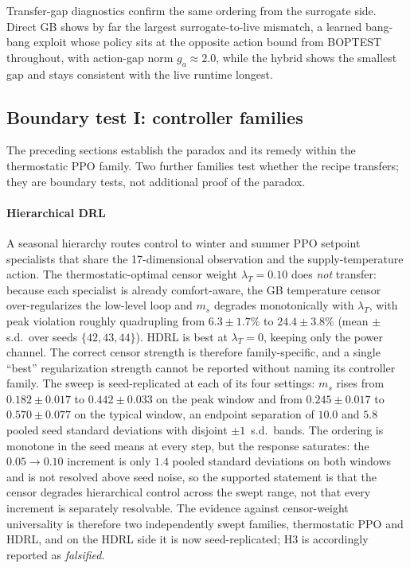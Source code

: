 \documentclass[5p]{elsarticle}
\newcommand{\ms}{\ensuremath{m_s}}
\begin{document}
Transfer-gap diagnostics confirm the same ordering from the surrogate side. Direct GB shows by far
the largest surrogate-to-live mismatch, a learned bang-bang exploit whose policy sits at the
opposite action bound from BOPTEST throughout, with action-gap norm $g_a\approx2.0$, while the
hybrid shows the smallest gap and stays consistent with the live runtime longest.

\subsection{Boundary test I: controller families}\label{sec:families}

The preceding sections establish the paradox and its remedy within the thermostatic PPO family. Two
further families test whether the recipe transfers; they are boundary tests, not additional proof of
the paradox.

\paragraph{Hierarchical DRL}
A seasonal hierarchy routes control to winter and summer PPO setpoint specialists that share the
17-dimensional observation and the supply-temperature action. The thermostatic-optimal censor weight
$\lambda_T=0.10$ does \emph{not} transfer: because each specialist is already comfort-aware, the GB
temperature censor over-regularizes the low-level loop and \ms{} degrades monotonically with
$\lambda_T$, with peak violation roughly quadrupling from $6.3\pm1.7\%$ to $24.4\pm3.8\%$
(mean $\pm$ s.d.\ over seeds $\{42,43,44\}$). HDRL is best at
$\lambda_T=0$, keeping only the power channel. The correct censor strength is therefore
family-specific, and a single ``best'' regularization strength cannot be reported without naming its
controller family. The sweep is seed-replicated at each of its four settings: \ms{} rises from
$0.182\pm0.017$ to $0.442\pm0.033$ on the peak window and from $0.245\pm0.017$ to
$0.570\pm0.077$ on the typical window, an endpoint separation of $10.0$ and $5.8$ pooled seed
standard deviations with disjoint $\pm1$~s.d.\ bands. The ordering is monotone in the seed means at
every step, but the response saturates: the $0.05\rightarrow0.10$ increment is only $1.4$ pooled
standard deviations on both windows and is not resolved above seed noise, so the supported statement
is that the censor degrades hierarchical control across the swept range, not that every increment is
separately resolvable. The evidence against censor-weight universality is therefore two
independently swept families, thermostatic PPO and HDRL, and on the HDRL side it is now
seed-replicated; H3 is accordingly reported as \emph{falsified}.
\end{document}
